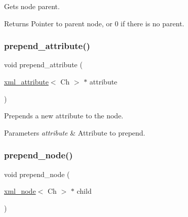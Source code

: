 Gets node parent. 

\begin{DoxyReturn}{Returns}
Pointer to parent node, or 0 if there is no parent. 
\end{DoxyReturn}
\mbox{\label{classrapidxml_1_1xml__node_af6dffa513da74cc0be71a7ba84f8265e}} 
\subsubsection{\texorpdfstring{prepend\+\_\+attribute()}{prepend\_attribute()}}
{\footnotesize\ttfamily void prepend\+\_\+attribute (\begin{DoxyParamCaption}\item[{\mbox{\hyperlink{classrapidxml_1_1xml__attribute}{xml\+\_\+attribute}}$<$ Ch $>$ $\ast$}]{attribute }\end{DoxyParamCaption})\hspace{0.3cm}{\ttfamily [inline]}}



Prepends a new attribute to the node. 


\begin{DoxyParams}{Parameters}
{\em attribute} & Attribute to prepend. \\
\hline
\end{DoxyParams}
\mbox{\label{classrapidxml_1_1xml__node_a0c39df6617e709eb2fba11300dea63f2}} 
\subsubsection{\texorpdfstring{prepend\+\_\+node()}{prepend\_node()}}
{\footnotesize\ttfamily void prepend\+\_\+node (\begin{DoxyParamCaption}\item[{\mbox{\hyperlink{classrapidxml_1_1xml__node}{xml\+\_\+node}}$<$ Ch $>$ $\ast$}]{child }\end{DoxyParamCaption})\hspace{0.3cm}{\ttfamily [inline]}}




